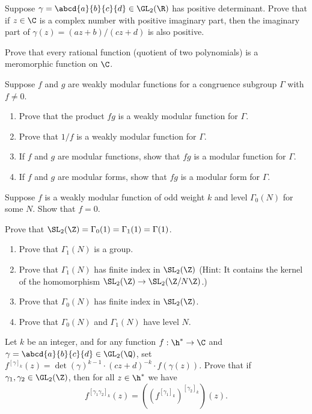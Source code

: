 \begin{exercises}
\item\label{ex:upperhalfpres}
Suppose $\gamma = \abcd{a}{b}{c}{d}\in\GL_2(\R)$ has
positive determinant.  Prove that if $z\in\C$ is a complex
number with positive imaginary part, then the imaginary
part of $\gamma(z) = (az+b)/(cz+d)$ is also positive.

\item\label{ex:meromorphic}
Prove that every rational function (quotient of two polynomials)
is a meromorphic function on $\C$.

\item \label{ex:wmfprod}
Suppose $f$ and $g$ are weakly modular functions for a congruence
subgroup $\Gamma$ with $f\neq 0$.
\begin{enumerate}
\item Prove that the product $fg$ is a weakly modular function for $\Gamma$.
\item Prove that $1/f$ is a weakly modular function  for $\Gamma$.
\item If $f$ and $g$ are modular functions, show that $fg$
is a modular function for $\Gamma$.
\item If $f$ and $g$ are modular forms, show that $fg$
is a modular form  for $\Gamma$.
\end{enumerate}

\item \label{ex:nomodformodd}
Suppose $f$ is a weakly modular function of odd weight $k$ and
level $\Gamma_0(N)$ for some $N$.
Show that $f=0$.

\item \label{ex:allsame} 
Prove that $\SL_2(\Z)=\Gamma_0(1)=\Gamma_1(1)=\Gamma(1)$.

\item \label{ex:conggamma1}
\begin{enumerate}
\item Prove that $\Gamma_1(N)$ is a group.
\item Prove that $\Gamma_1(N)$ has finite index in $\SL_2(\Z)$
(Hint: It contains the kernel of the homomorphism
$\SL_2(\Z) \to \SL_2(\Z/N\Z)$.)
\item Prove that $\Gamma_0(N)$ has finite index in $\SL_2(\Z)$.
\item Prove that $\Gamma_0(N)$ and $\Gamma_1(N)$ have
level $N$.
\end{enumerate}

\item \label{ex:grpact}
Let $k$ be an integer, and for any function
$f:\h^*\to \C$ and $\gamma=\abcd{a}{b}{c}{d}\in\GL_2(\Q)$,
set $f^{[\gamma]_k}(z) = \det(\gamma)^{k-1} \cdot (cz+d)^{-k} \cdot f(\gamma(z))$. 
Prove that if $\gamma_1, \gamma_2 \in \GL_2(\Z)$,
then for all $z\in \h^*$ we have 
$$
 f^{[\gamma_1 \gamma_2]_k}(z)  = ((f^{[\gamma_1]_k})^{[\gamma_2]_k})(z).
$$



\end{exercises}
